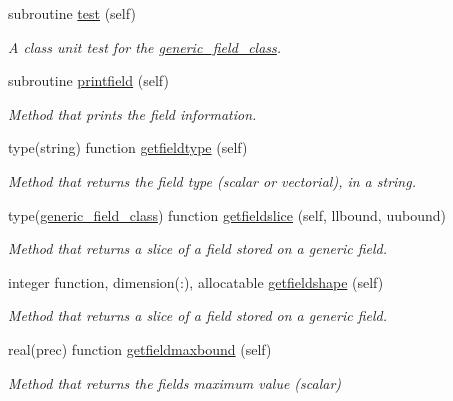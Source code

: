 \begin{DoxyCompactItemize}
subroutine \mbox{\hyperlink{namespacefieldtypes__mod_a0babd6327ed77199d5437d17de34bafe}{test}} (self)
\begin{DoxyCompactList}\small\item\em A class \textquotesingle{}unit\textquotesingle{} test for the \mbox{\hyperlink{structfieldtypes__mod_1_1generic__field__class}{generic\+\_\+field\+\_\+class}}. \end{DoxyCompactList}\item 
subroutine \mbox{\hyperlink{namespacefieldtypes__mod_a5a556fba603c1d39b20713fdbc813332}{printfield}} (self)
\begin{DoxyCompactList}\small\item\em Method that prints the field information. \end{DoxyCompactList}\item 
type(string) function \mbox{\hyperlink{namespacefieldtypes__mod_a5faf9c157541acaa9681be2d59eda850}{getfieldtype}} (self)
\begin{DoxyCompactList}\small\item\em Method that returns the field type (scalar or vectorial), in a string. \end{DoxyCompactList}\item 
type(\mbox{\hyperlink{structfieldtypes__mod_1_1generic__field__class}{generic\+\_\+field\+\_\+class}}) function \mbox{\hyperlink{namespacefieldtypes__mod_ac35041b0ab166699a4fda1d0fa02ec67}{getfieldslice}} (self, llbound, uubound)
\begin{DoxyCompactList}\small\item\em Method that returns a slice of a field stored on a generic field. \end{DoxyCompactList}\item 
integer function, dimension(\+:), allocatable \mbox{\hyperlink{namespacefieldtypes__mod_ab8a0fa52771fc81b6f8a39cbb9ad2c34}{getfieldshape}} (self)
\begin{DoxyCompactList}\small\item\em Method that returns a slice of a field stored on a generic field. \end{DoxyCompactList}\item 
real(prec) function \mbox{\hyperlink{namespacefieldtypes__mod_a1012f73b2800753dd774d0dbff861b6f}{getfieldmaxbound}} (self)
\begin{DoxyCompactList}\small\item\em Method that returns the field\textquotesingle{}s maximum value (scalar) \end{DoxyCompactList}\item 

\end{DoxyCompactItemize}
